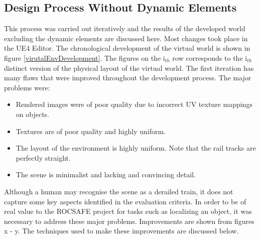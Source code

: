 \subsection{Design Process Without Dynamic Elements}
This process was carried out iteratively and the results of the developed world excluding the dynamic elements are discussed here. Most changes took place in the UE4 Editor. The chronological development of the virtual world is shown in figure \ref{virutalEnvDevelopment}. The figures on the i$_{th}$ row corresponds to the i$_{th}$ distinct version of the physical layout of the virtual world. The first iteration has many flaws that were improved throughout the development process. The major problems were:
\begin{itemize}
    \item Rendered images were of poor quality due to incorrect UV texture mappings %
    on objects.
    \item Textures are of poor quality and highly uniform.
    \item The layout of the environment is highly uniform. Note that the rail tracks are perfectly straight.
    \item The scene is minimalist and lacking and convincing detail.
\end{itemize}
Although a human may recognise the scene as a derailed train, it does not capture some key aspects identified in the evaluation criteria. In order to be of real value to the ROCSAFE project for tasks such as localizing an object, it was necessary to address these major problems. Improvements are shown from figures x - y. The techniques used to make these improvements are discussed below.



